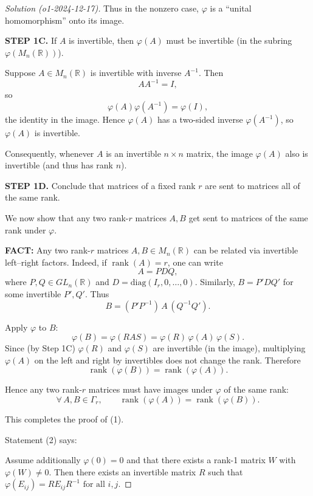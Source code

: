 \documentclass[11pt]{article}
\numberwithin{equation}{section}
\begin{document}
\begin{proof}[Solution (o1-2024-12-17)]
Thus in the nonzero case, $\varphi$ is a ``unital homomorphism'' onto its image.

\textbf{STEP 1C.} If $A$ is invertible, then $\varphi(A)$ must be invertible (in the subring $\varphi(M_n(\mathbb{R}))$).

Suppose $A\in M_n(\mathbb{R})$ is invertible with inverse $A^{-1}$.  Then 
\[
A A^{-1} = I,
\]
so  
\[
\varphi(A)\varphi(A^{-1}) = \varphi(I),
\]
the identity in the image.  Hence $\varphi(A)$ has a two-sided inverse $\varphi(A^{-1})$, so $\varphi(A)$ is invertible.

Consequently, whenever $A$ is an invertible $n\times n$ matrix, the image $\varphi(A)$ also is invertible (and thus has rank $n$).

\textbf{STEP 1D.} Conclude that matrices of a fixed rank $r$ are sent to matrices all of the same rank.

We now show that any two rank-$r$ matrices $A,B$ get sent to matrices of the same rank under $\varphi$.

\textbf{FACT:} Any two rank-$r$ matrices $A,B\in M_n(\mathbb{R})$ can be related via invertible left–right factors.  
Indeed, if $\operatorname{rank}(A)=r$, one can write
\[
A = P D Q,
\]
where $P,Q\in GL_n(\mathbb{R})$ and $D=\mathrm{diag}(I_r,0,\dots,0)$.  
Similarly, $B=P' D Q'$ for some invertible $P',Q'$.  
Thus
\[
B = (P' P^{-1})\, A\, (Q^{-1} Q').
\]

Apply $\varphi$ to $B$:
\[
\varphi(B)=\varphi(R A S)=\varphi(R)\,\varphi(A)\,\varphi(S).
\]
Since (by Step 1C) $\varphi(R)$ and $\varphi(S)$ are invertible (in the image), multiplying $\varphi(A)$ on the left and right by invertibles does not change the rank.  Therefore
\[
\operatorname{rank}(\varphi(B))=\operatorname{rank}(\varphi(A)).
\]

Hence any two rank-$r$ matrices must have images under $\varphi$ of the same rank:
\[
\forall\, A,B\in \Gamma_r,\qquad \operatorname{rank}(\varphi(A))=\operatorname{rank}(\varphi(B)).
\]

This completes the proof of (1).


Statement (2) says:

Assume additionally $\varphi(0)=0$ and that there exists a rank-1 matrix $W$ with $\varphi(W)\neq 0$. Then there exists an invertible matrix $R$ such that 
$\varphi(E_{ij})=R E_{ij} R^{-1}\text{ for all } i,j.$



\end{proof}
\end{document}

